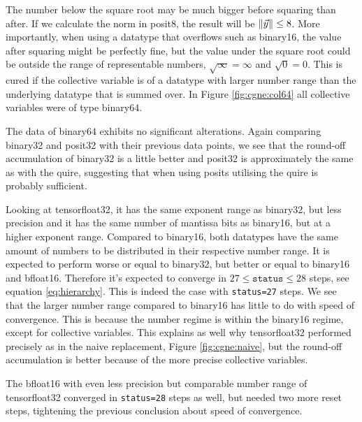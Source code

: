 \documentclass{article}
\theoremstyle{plain} %
\theoremstyle{convention} %
\theoremstyle{remark} %
\def\code#1{\texttt{#1}}
\numberwithin{equation}{section}
\begin{document}
The number below the square root may be much bigger before squaring than after. If we calculate the norm in \gls{posit8}, the result will be $\norm{\vec{y}} \leq 8$. More importantly, when using a datatype that overflows such as \gls{binary16}, the value after squaring might be perfectly fine, but the value under the square root could be outside the range of representable numbers, $\sqrt{\infty} = \infty$ and $\sqrt{0} = 0$. This is cured if the collective variable is of a datatype with larger number range than the underlying datatype that is summed over. In Figure \ref{fig:cgne:col64} all collective variables were of type \gls{binary64}.

The data of \gls{binary64} exhibits no significant alterations. Again comparing \gls{binary32} and \gls{posit32} with their previous data points, we see that the round-off accumulation of \gls{binary32} is a little better and \gls{posit32} is approximately the same as with the \gls{quire}, suggesting that when using posits utilising the \gls{quire} is probably sufficient.

Looking at \gls{tensorfloat32}, it has the same exponent range as \gls{binary32}, but less precision and it has the same number of mantissa bits as \gls{binary16}, but at a higher exponent range. Compared to \gls{binary16}, both datatypes have the same amount of numbers to be distributed in their respective number range. It is expected to perform worse or equal to \gls{binary32}, but better or equal to \gls{binary16} and \gls{bfloat16}. Therefore it's expected to converge in $27 \le \code{status} \le 28$ steps, see equation \eqref{eq:hierarchy}. This is indeed the case with \code{status=27} steps. We see that the larger number range compared to \gls{binary16} has little to do with speed of convergence. This is because the number regime is within the \gls{binary16} regime, except for collective variables. This explains as well why \gls{tensorfloat32} performed precisely as in the naive replacement, Figure \ref{fig:cgne:naive}, but the round-off accumulation is better because of the more precise collective variables.

The \gls{bfloat16} with even less precision but comparable number range of \gls{tensorfloat32} converged in \code{status=28} steps as well, but needed two more reset steps, tightening the previous conclusion about speed of convergence.
\end{document}
